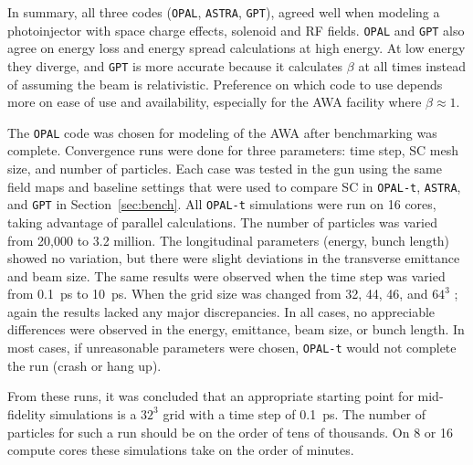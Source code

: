 In summary, all three codes (\verb|OPAL|, \verb|ASTRA|, \verb|GPT|), agreed well when modeling a photoinjector
with space charge effects, solenoid and RF fields.
\verb|OPAL| and \verb|GPT| also agree on energy loss and energy spread calculations at high energy.
At low energy they diverge, and \verb|GPT| is more accurate because it calculates 
$\beta$ at all times instead of assuming the beam is relativistic.
Preference on which code to use depends more on ease of use 
and availability, especially for the AWA facility where $\beta\approx 1$. 


The \verb|OPAL| code was chosen for modeling of the AWA after benchmarking was complete.
Convergence runs were done for three parameters: 
time step, SC mesh size, and number of particles.  
Each case was tested in the gun using the same field maps and 
baseline settings that were used to compare SC in \verb|OPAL-t|,  
\verb|ASTRA|, and \verb|GPT| in Section~\ref{sec:bench}. 
All \verb|OPAL-t| simulations were run on 
16 cores, taking advantage of parallel calculations. 
The number of particles was varied from 20,000 to 3.2 million.  
The longitudinal parameters (energy,  bunch length)  
showed no variation, but there were slight deviations 
in the transverse emittance and beam size. The same results 
were observed when the time step was varied from \SI{0.1}{ps} to \SI{10}{ps}.  
When the grid size was changed from 32, 44, 46, and $64^3$ ; 
again the results lacked any major discrepancies.  
In all cases, no appreciable differences were observed in the energy,
emittance, beam size, or bunch length. In  most  cases,  
if unreasonable  parameters  were chosen, 
\verb|OPAL-t| would not complete the run (crash or hang up).  

From these runs, it was concluded that an appropriate starting point 
for mid-fidelity simulations is a $32^3$  grid with a time step
of \SI{0.1}{ps}. The number of particles for such a run should be on the
order of tens of thousands. On 8 or 16 compute cores
these simulations take on the order of minutes.


